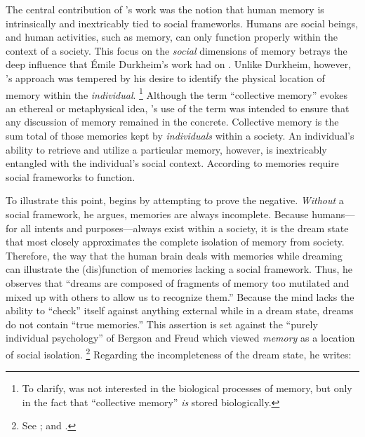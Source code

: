 The central contribution of \halbwachs's work was the notion that human memory is intrinsically and inextricably tied to social frameworks.%
    \autocite[37--38]{halbwachs1992}
Humans are social beings, and human activities, such as memory, can only function properly within the context of a society. This focus on the \emph{social} dimensions of memory betrays the deep influence that Émile Durkheim's work had on \halbwachs.%
    \autocite[8--9]{coser_halbwachs1992}
Unlike Durkheim, however, \halbwachs's approach was tempered by his desire to identify the physical location of memory within the \emph{individual}.%
    \footnote{%
        To clarify, \halbwachs was not  interested in the biological processes of memory, but only in the fact that ``collective memory'' \emph{is} stored biologically.}
%
Although the term ``collective memory'' evokes an ethereal or metaphysical idea, \halbwachs's use of the term was intended to ensure that any discussion of memory remained in the concrete. Collective memory is the sum total of those memories kept by \emph{individuals} within a society. An individual's ability to retrieve and utilize a particular memory, however, is inextricably entangled with the individual's social context. According to \halbwachs memories require social frameworks to function.%
    \autocite[38]{halbwachs1992}  

To illustrate this point, \halbwachs begins  by attempting to prove the negative. \emph{Without} a social framework, he argues, memories are always incomplete. Because humans---for all intents and purposes---always exist within a society, it is the dream state that most closely approximates the complete isolation of memory from society.%
    \autocite[41--42]{halbwachs1992}
Therefore, the way that the human brain deals with memories while dreaming can illustrate the (dis)function of memories lacking a social framework. Thus, he observes that ``dreams are composed of fragments of memory too mutilated and mixed up with others to allow us to recognize them.''%
    \autocite[41]{halbwachs1992}
Because the mind lacks the ability to ``check'' itself against anything external while in a dream state, dreams do not contain ``true memories.''%
    \autocite[41]{halbwachs1992}
This assertion is set against the ``purely individual psychology'' of Bergson and Freud which viewed \emph{memory} as a location of social isolation.%
    \footnote{%
        See 
        \cite{ansellpearson_radstone-schwarz2011}; and 
        \cite{terdiman_radstone-schwarz2011}.}
Regarding the incompleteness of the dream state, he writes:  

